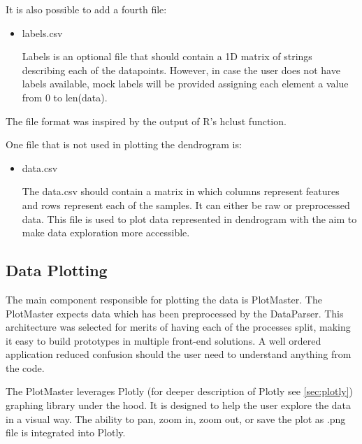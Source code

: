 It is also possible to add a fourth file:
\begin{itemize}
    \item labels.csv
    
    Labels is an optional file that should contain a 1D matrix of strings describing each of the datapoints. However, in case the user does not have labels available, mock labels will be provided assigning each element a value from 0 to len(data). 
\end{itemize}

The file format was inspired by the output of R's hclust function.

One file that is not used in plotting the dendrogram is:
\begin{itemize}
    \item data.csv
    
    The data.csv should contain a matrix in which columns represent features and rows represent each of the samples. It can either be raw or preprocessed data. This file is used to plot data represented in dendrogram with the aim to make data exploration more accessible.
\end{itemize}

\subsection{Data Plotting}
\label{sec:data-plotting}
The main component responsible for plotting the data is PlotMaster. The PlotMaster expects data which has been preprocessed by the DataParser. This architecture was selected for merits of having each of the processes split, making it easy to build prototypes in multiple front-end solutions. A well ordered application reduced confusion should the user need to understand anything from the code. 

The PlotMaster leverages Plotly (for deeper description of Plotly see \ref{sec:plotly}) graphing library under the hood. It is designed to help the user explore the data in a visual way. The ability to pan, zoom in, zoom out, or save the plot as .png file is integrated into Plotly. 

